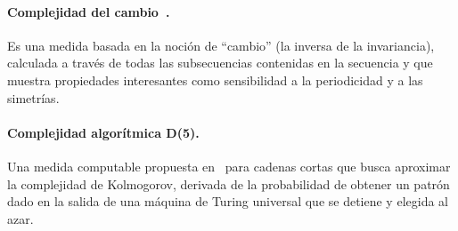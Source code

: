\paragraph{Complejidad del cambio~\cite{f47}.} Es una medida basada en la noción de ``cambio'' (la inversa de la invariancia), calculada 
a través de todas las subsecuencias contenidas en la secuencia y que muestra propiedades interesantes como sensibilidad a la periodicidad y a las simetrías.


\paragraph{Complejidad algorítmica D(5).} Una medida computable propuesta en~\cite{f44,f45,f46} para cadenas cortas que busca aproximar la complejidad de Kolmogorov, derivada de la probabilidad de obtener un patrón dado en la salida de una máquina de Turing universal que se detiene y elegida al azar.

